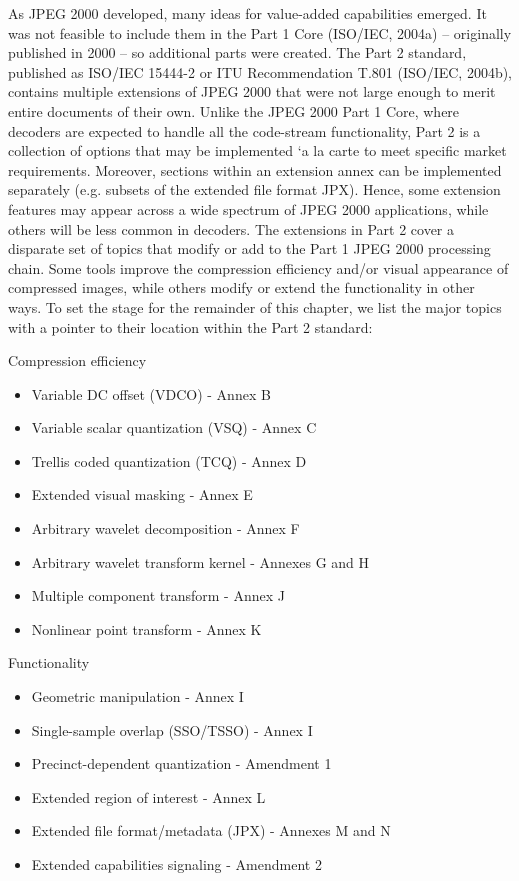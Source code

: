 As JPEG 2000 developed, many ideas for value-added capabilities emerged. It was not
feasible to include them in the Part 1 Core (ISO/IEC, 2004a) – originally published
in 2000 – so additional parts were created. The Part 2 standard, published as ISO/IEC
15444-2 or ITU Recommendation T.801 (ISO/IEC, 2004b), contains multiple extensions
of JPEG 2000 that were not large enough to merit entire documents of their own.
Unlike the JPEG 2000 Part 1 Core, where decoders are expected to handle all the
code-stream functionality, Part 2 is a collection of options that may be implemented `a la
carte to meet specific market requirements. Moreover, sections within an extension annex
can be implemented separately (e.g. subsets of the extended file format JPX). Hence,
some extension features may appear across a wide spectrum of JPEG 2000 applications,
while others will be less common in decoders.
The extensions in Part 2 cover a disparate set of topics that modify or add to the Part 1
JPEG 2000 processing chain. Some tools improve the compression efficiency and/or visual
appearance of compressed images, while others modify or extend the functionality in other
ways. To set the stage for the remainder of this chapter, we list the major topics with a
pointer to their location within the Part 2 standard:

Compression efficiency
\begin{itemize}
    \item Variable DC offset (VDCO) - Annex B
    \item Variable scalar quantization (VSQ) - Annex C
    \item Trellis coded quantization (TCQ) - Annex D
    \item Extended visual masking - Annex E
    \item Arbitrary wavelet decomposition - Annex F
    \item Arbitrary wavelet transform kernel - Annexes G and H
    \item Multiple component transform - Annex J
    \item Nonlinear point transform - Annex K
\end{itemize}

Functionality
\begin{itemize} 
    \item Geometric manipulation - Annex I
    \item Single-sample overlap (SSO/TSSO) - Annex I
    \item Precinct-dependent quantization - Amendment 1
    \item Extended region of interest - Annex L
    \item Extended file format/metadata (JPX) - Annexes M and N
    \item Extended capabilities signaling - Amendment 2
\end{itemize}

